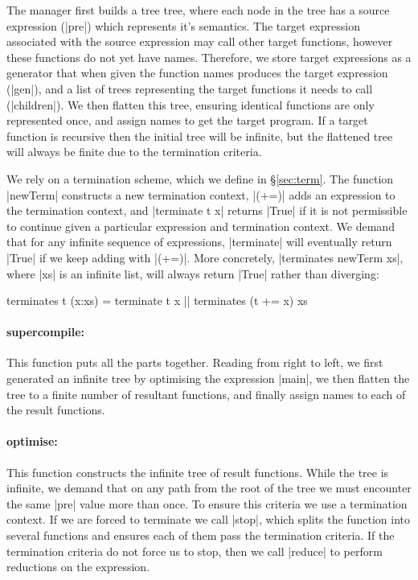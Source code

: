\documentclass[draft]{sigplanconf}
\begin{document}
The manager first builds a tree tree, where each node in the tree has a source expression (|pre|) which represents it's semantics. The target expression associated with the source expression may call other target functions, however these functions do not yet have names. Therefore, we store target expressions as a generator that when given the function names produces the target expression (|gen|), and a list of trees representing the target functions it needs to call (|children|). We then flatten this tree, ensuring identical functions are only represented once, and assign names to get the target program. If a target function is recursive then the initial tree will be infinite, but the flattened tree will always be finite due to the termination criteria.

We rely on a termination scheme, which we define in \S\ref{sec:term}. The function |newTerm| constructs a new termination context, |(+=)| adds an expression to the termination context, and |terminate t x| returns |True| if it is not permissible to continue given a particular expression and termination context. We demand that for any infinite sequence of expressions, |terminate| will eventually return |True| if we keep adding with |(+=)|. More concretely, |terminates newTerm xs|, where |xs| is an infinite list, will always return |True| rather than diverging:

\begin{code}
terminates t (x:xs) = terminate t x || terminates (t += x) xs
\end{code}

\newcommand{\function}[1]{\paragraph{\textsf{#1:}}\hspace{-3mm}}

\function{supercompile} This function puts all the parts together. Reading from right to left, we first generated an infinite tree by optimising the expression |main|, we then flatten the tree to a finite number of resultant functions, and finally assign names to each of the result functions.

\function{optimise} This function constructs the infinite tree of result functions. While the tree is infinite, we demand that on any path from the root of the tree we must encounter the same |pre| value more than once. To ensure this criteria we use a termination context. If we are forced to terminate we call |stop|, which splits the function into several functions and ensures each of them pass the termination criteria. If the termination criteria do not force us to stop, then we call |reduce| to perform reductions on the expression.
\end{document}
